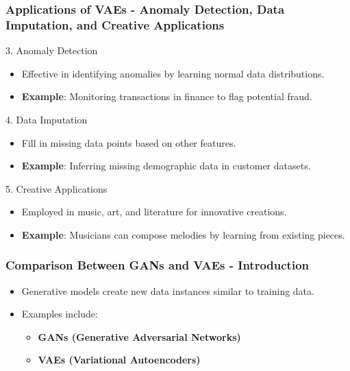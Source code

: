 \documentclass[aspectratio=169]{beamer}
\begin{document}
\begin{frame}[fragile]
    \frametitle{Applications of VAEs - Anomaly Detection, Data Imputation, and Creative Applications}
    \begin{block}{3. Anomaly Detection}
        \begin{itemize}
            \item Effective in identifying anomalies by learning normal data distributions.
            \item \textbf{Example}: Monitoring transactions in finance to flag potential fraud.
        \end{itemize}
    \end{block}
    
    \begin{block}{4. Data Imputation}
        \begin{itemize}
            \item Fill in missing data points based on other features.
            \item \textbf{Example}: Inferring missing demographic data in customer datasets.
        \end{itemize}
    \end{block}
    
    \begin{block}{5. Creative Applications}
        \begin{itemize}
            \item Employed in music, art, and literature for innovative creations.
            \item \textbf{Example}: Musicians can compose melodies by learning from existing pieces.
        \end{itemize}
    \end{block}
\end{frame}

\begin{frame}[fragile]
    \frametitle{Comparison Between GANs and VAEs - Introduction}
    \begin{itemize}
        \item Generative models create new data instances similar to training data.
        \item Examples include:
            \begin{itemize}
                \item \textbf{GANs (Generative Adversarial Networks)}
                \item \textbf{VAEs (Variational Autoencoders)}
            \end{itemize}
    \end{itemize}
\end{frame}
\end{document}
